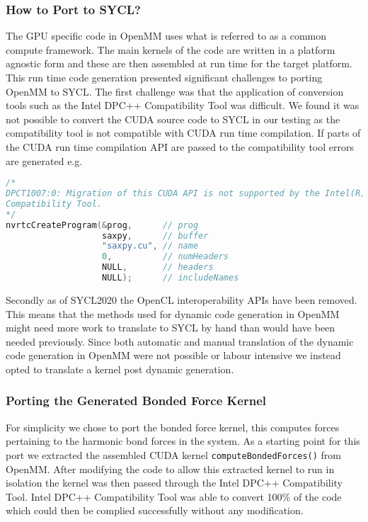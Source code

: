 \documentclass[../main]{subfiles}
\begin{document}
\subsubsection{How to Port to SYCL?}\label{sec:openmm_howtoport}

The GPU specific code in OpenMM uses what is referred to as a common compute framework.
The main kernels of the code are written in a platform agnostic form and these are then assembled at run time for the target platform.
This run time code generation presented significant challenges to porting OpenMM to SYCL.
The first challenge was that the application of conversion tools such as the Intel DPC++ Compatibility Tool was difficult.
We found it was not possible to convert the CUDA source code to SYCL in our testing as the compatibility tool is not compatible with CUDA run time compilation.
If parts of the CUDA run time compilation API are passed to the compatibility tool errors are generated e.g.

\begin{lstlisting}[basicstyle=\footnotesize\ttfamily,language=C++]
/*
DPCT1007:0: Migration of this CUDA API is not supported by the Intel(R) DPC++
Compatibility Tool.
*/
nvrtcCreateProgram(&prog,      // prog
                   saxpy,      // buffer
                   "saxpy.cu", // name
                   0,          // numHeaders
                   NULL,       // headers
                   NULL);      // includeNames

\end{lstlisting}


Secondly as of SYCL2020 the OpenCL interoperability APIs have been removed.
This means that the methods used for dynamic code generation in OpenMM might need more work to translate to SYCL by hand than would have been needed previously.
Since both automatic and manual translation of the dynamic code generation in OpenMM were not possible or labour intensive we instead opted to translate a kernel post dynamic generation.

\subsubsection{Porting the Generated Bonded Force Kernel}\label{sec:openmm_porting_genbf_kernel}

For simplicity we chose to port the bonded force kernel, this computes forces pertaining to the harmonic bond forces in the system.
As a starting point for this port we extracted the assembled CUDA kernel \verb!computeBondedForces()! from OpenMM.
After modifying the code to allow this extracted kernel to run in isolation the kernel was then passed through the Intel DPC++ Compatibility Tool.
Intel DPC++ Compatibility Tool was able to convert 100$\%$ of the code which could then be complied successfully without any modification.
\end{document}
